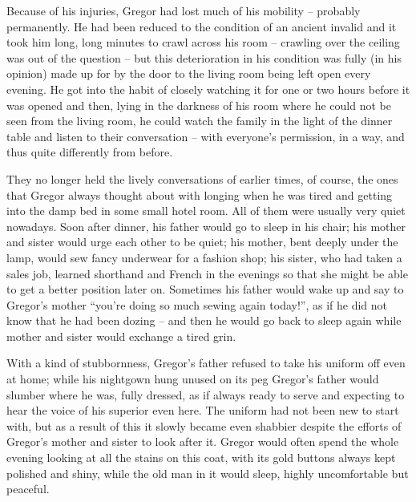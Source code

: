 Because of his injuries, Gregor had lost much of his mobility – probably
permanently. He had been reduced to the condition of an ancient invalid
and it took him long, long minutes to crawl across his room – crawling
over the ceiling was out of the question – but this deterioration in his
condition was fully (in his opinion) made up for by the door to the
living room being left open every evening. He got into the habit of
closely watching it for one or two hours before it was opened and then,
lying in the darkness of his room where he could not be seen from the
living room, he could watch the family in the light of the dinner table
and listen to their conversation – with everyone’s permission, in a way,
and thus quite differently from before.

They no longer held the lively conversations of earlier times, of
course, the ones that Gregor always thought about with longing when he
was tired and getting into the damp bed in some small hotel room. All
of them were usually very quiet nowadays. Soon after dinner, his father
would go to sleep in his chair; his mother and sister would urge each
other to be quiet; his mother, bent deeply under the lamp, would sew
fancy underwear for a fashion shop; his sister, who had taken a sales
job, learned shorthand and French in the evenings so that she might be
able to get a better position later on. Sometimes his father would wake
up and say to Gregor’s mother “you’re doing so much sewing again
today!”, as if he did not know that he had been dozing – and then he
would go back to sleep again while mother and sister would exchange a
tired grin.

With a kind of stubbornness, Gregor’s father refused to take his
uniform off even at home; while his nightgown hung unused on its peg
Gregor’s father would slumber where he was, fully dressed, as if always
ready to serve and expecting to hear the voice of his superior even
here. The uniform had not been new to start with, but as a result of
this it slowly became even shabbier despite the efforts of Gregor’s
mother and sister to look after it. Gregor would often spend the whole
evening looking at all the stains on this coat, with its gold buttons
always kept polished and shiny, while the old man in it would sleep,
highly uncomfortable but peaceful.

